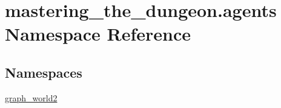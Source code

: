 \hypertarget{namespacemastering__the__dungeon_1_1agents}{}\section{mastering\+\_\+the\+\_\+dungeon.\+agents Namespace Reference}
\label{namespacemastering__the__dungeon_1_1agents}
\subsection*{Namespaces}
\begin{DoxyCompactItemize}
\item 
 \hyperlink{namespacemastering__the__dungeon_1_1agents_1_1graph__world2}{graph\+\_\+world2}
\end{DoxyCompactItemize}

